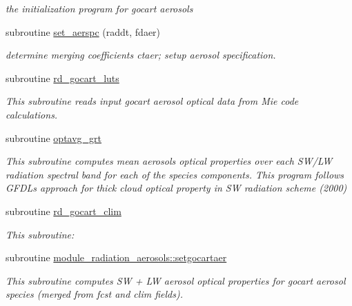 \begin{DoxyCompactItemize}
\begin{DoxyCompactList}\small\item\em the initialization program for gocart aerosols \end{DoxyCompactList}\item 
subroutine \hyperlink{radiation__aerosols_8f_afb13b833ac59cf949702bdbde93d2c44}{set\+\_\+aerspc} (raddt, fdaer)
\begin{DoxyCompactList}\small\item\em determine merging coefficients ctaer; setup aerosol specification. \end{DoxyCompactList}\item 
subroutine \hyperlink{radiation__aerosols_8f_a8b6a882f91674d1c0f7f71f297a5f92e}{rd\+\_\+gocart\+\_\+luts}
\begin{DoxyCompactList}\small\item\em This subroutine reads input gocart aerosol optical data from Mie code calculations. \end{DoxyCompactList}\item 
subroutine \hyperlink{radiation__aerosols_8f_a8d1f5010e8cbc6abda50b8fc233ad7e9}{optavg\+\_\+grt}
\begin{DoxyCompactList}\small\item\em This subroutine computes mean aerosols optical properties over each S\+W/\+LW radiation spectral band for each of the species components. This program follows G\+F\+DL\textquotesingle{}s approach for thick cloud optical property in SW radiation scheme (2000) \end{DoxyCompactList}\item 
subroutine \hyperlink{radiation__aerosols_8f_a15bad8499ffd17d967e5788cd6721c4d}{rd\+\_\+gocart\+\_\+clim}
\begin{DoxyCompactList}\small\item\em This subroutine\+: \end{DoxyCompactList}\item 
subroutine \hyperlink{namespacemodule__radiation__aerosols_abb28d29c21a8905eda601bfe5bfb3df4}{module\+\_\+radiation\+\_\+aerosols\+::setgocartaer}                                                                                   
\begin{DoxyCompactList}\small\item\em This subroutine computes SW + LW aerosol optical properties for gocart aerosol species (merged from fcst and clim fields). \end{DoxyCompactList}\item 

\end{DoxyCompactItemize}
